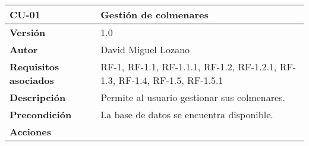 \begin{longtable}[H]{@{}ll@{}}
\toprule
\begin{minipage}[b]{0.23\columnwidth}\raggedright\strut
\textbf{CU-01}\strut
\end{minipage} & \begin{minipage}[b]{0.71\columnwidth}\raggedright\strut
\textbf{Gestión de colmenares}\strut
\end{minipage}\tabularnewline
\midrule
\endhead
\begin{minipage}[t]{0.23\columnwidth}\raggedright\strut
\textbf{Versión}\strut
\end{minipage} & \begin{minipage}[t]{0.71\columnwidth}\raggedright\strut
1.0\strut
\end{minipage}\tabularnewline
\begin{minipage}[t]{0.23\columnwidth}\raggedright\strut
\textbf{Autor}\strut
\end{minipage} & \begin{minipage}[t]{0.71\columnwidth}\raggedright\strut
David Miguel Lozano\strut
\end{minipage}\tabularnewline
\begin{minipage}[t]{0.23\columnwidth}\raggedright\strut
\textbf{Requisitos asociados}\strut
\end{minipage} & \begin{minipage}[t]{0.71\columnwidth}\raggedright\strut
RF-1, RF-1.1, RF-1.1.1, RF-1.2, RF-1.2.1, RF-1.3, RF-1.4, RF-1.5,
RF-1.5.1\strut
\end{minipage}\tabularnewline
\begin{minipage}[t]{0.23\columnwidth}\raggedright\strut
\textbf{Descripción}\strut
\end{minipage} & \begin{minipage}[t]{0.71\columnwidth}\raggedright\strut
Permite al usuario gestionar sus colmenares.\strut
\end{minipage}\tabularnewline
\begin{minipage}[t]{0.23\columnwidth}\raggedright\strut
\textbf{Precondición}\strut
\end{minipage} & \begin{minipage}[t]{0.71\columnwidth}\raggedright\strut
La base de datos se encuentra disponible.\strut
\end{minipage}\tabularnewline
\begin{minipage}[t]{0.23\columnwidth}\raggedright\strut
\textbf{Acciones}\strut
\end{minipage} & \begin{minipage}[t]{0.71\columnwidth}\raggedright\strut

\end{minipage}
\end{longtable}
